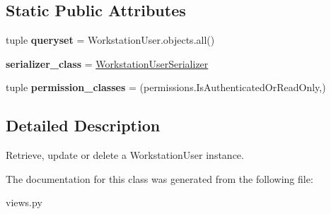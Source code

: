 \subsection*{Static Public Attributes}
\begin{DoxyCompactItemize}
\item 
\hypertarget{classrestriction__system_1_1views_1_1WorkstationUserViewSet_a0f2996c55c89cb53aeae94827c4fc117}{}tuple {\bfseries queryset} = Workstation\+User.\+objects.\+all()\label{classrestriction__system_1_1views_1_1WorkstationUserViewSet_a0f2996c55c89cb53aeae94827c4fc117}

\item 
\hypertarget{classrestriction__system_1_1views_1_1WorkstationUserViewSet_a5e6cd61279d825f3831cf8261f81c73f}{}{\bfseries serializer\+\_\+class} = \hyperlink{classrestriction__system_1_1serializers_1_1WorkstationUserSerializer}{Workstation\+User\+Serializer}\label{classrestriction__system_1_1views_1_1WorkstationUserViewSet_a5e6cd61279d825f3831cf8261f81c73f}

\item 
\hypertarget{classrestriction__system_1_1views_1_1WorkstationUserViewSet_a226c710755db7ea6e927f70628b757ca}{}tuple {\bfseries permission\+\_\+classes} = (permissions.\+Is\+Authenticated\+Or\+Read\+Only,)\label{classrestriction__system_1_1views_1_1WorkstationUserViewSet_a226c710755db7ea6e927f70628b757ca}

\end{DoxyCompactItemize}


\subsection{Detailed Description}
Retrieve, update or delete a Workstation\+User instance. 



The documentation for this class was generated from the following file\+:\begin{DoxyCompactItemize}
\item 
views.\+py\end{DoxyCompactItemize}
